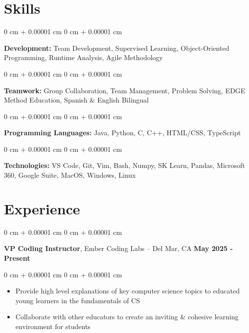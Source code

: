 \documentclass[10pt, letterpaper]{article}
\newenvironment{highlights}{
    \begin{itemize}[
        topsep=0.10 cm,
        parsep=0.10 cm,
        partopsep=0pt,
        itemsep=0pt,
        leftmargin=0 cm + 10pt
    ]
}{
    \end{itemize}
} %
\newenvironment{onecolentry}{
    \begin{adjustwidth}{
        0 cm + 0.00001 cm
    }{
        0 cm + 0.00001 cm
    }
}{
    \end{adjustwidth}
} %
\newenvironment{twocolentry}[2][]{
    \onecolentry%
    \def\secondColumn{#2}
    \setcolumnwidth{\fill, 7.0 cm}
    \begin{paracol}{2}
}{
    \switchcolumn\raggedleft\secondColumn%
    \end{paracol}
    \endonecolentry%
} %
\begin{document}
    
    
    {\color{secondaryColor}\section{Skills}}
        
        \begin{onecolentry}
            \textbf{Development:} Team Development, Supervised Learning, Object-Oriented Programming, Runtime Analysis, Agile Methodology
        \end{onecolentry}

        \vspace{0.10 cm}

        \begin{onecolentry}
            \textbf{Teamwork:} Group Collaboration, Team Management, Problem Solving, EDGE Method Education, Spanish \& English Bilingual
        \end{onecolentry}

        \vspace{0.10 cm}
        
        \begin{onecolentry}
            \textbf{Programming Languages:} Java, Python, C, C++, HTML/CSS, TypeScript
        \end{onecolentry}

        \vspace{0.10 cm}
        
        \begin{onecolentry}
            \textbf{Technologies:} VS Code, Git, Vim, Bash, Numpy, SK Learn, Pandas, Microsoft 360, Google Suite, MacOS, Windows, Linux
        \end{onecolentry}
    
    {\color{secondaryColor}\section{Experience}}


        
        \begin{twocolentry}{
            {\color{secondaryColor}\textbf{May 2025 - Present}}
        }
            \textbf{VP Coding Instructor}, Ember Coding Labs -- Del Mar, CA\end{twocolentry}

        \vspace{0.10 cm}
        \begin{onecolentry}
            \begin{highlights}
                \item Provide high level explanations of key computer science topics to educated young learners in the fundamentals of CS
                \item Collaborate with other educators to create an inviting \& cohesive learning environment for students
            \end{highlights}
        \end{onecolentry}
\end{document}
